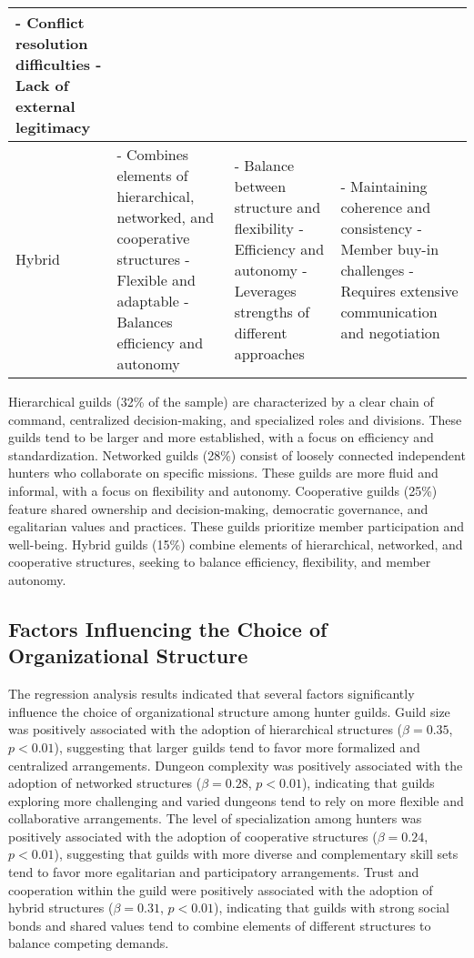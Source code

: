 \documentclass[12pt, a4paper]{article}
\begin{document}
\begin{table}[h]
\begin{tabular}{p{2.5cm}p{3.5cm}p{3.5cm}p{3.5cm}}
- Conflict resolution difficulties\newline
- Lack of external legitimacy
\\
\hline
Hybrid & 
- Combines elements of hierarchical, networked, and cooperative structures\newline
- Flexible and adaptable\newline
- Balances efficiency and autonomy
&
- Balance between structure and flexibility\newline
- Efficiency and autonomy\newline
- Leverages strengths of different approaches
&
- Maintaining coherence and consistency\newline
- Member buy-in challenges\newline
- Requires extensive communication and negotiation
\\
\hline
\end{tabular}
\end{table}

Hierarchical guilds (32\% of the sample) are characterized by a clear chain of command, centralized decision-making, and specialized roles and divisions. These guilds tend to be larger and more established, with a focus on efficiency and standardization. Networked guilds (28\%) consist of loosely connected independent hunters who collaborate on specific missions. These guilds are more fluid and informal, with a focus on flexibility and autonomy. Cooperative guilds (25\%) feature shared ownership and decision-making, democratic governance, and egalitarian values and practices. These guilds prioritize member participation and well-being. Hybrid guilds (15\%) combine elements of hierarchical, networked, and cooperative structures, seeking to balance efficiency, flexibility, and member autonomy.

\subsection{Factors Influencing the Choice of Organizational Structure}
The regression analysis results indicated that several factors significantly influence the choice of organizational structure among hunter guilds. Guild size was positively associated with the adoption of hierarchical structures ($\beta = 0.35$, $p < 0.01$), suggesting that larger guilds tend to favor more formalized and centralized arrangements. Dungeon complexity was positively associated with the adoption of networked structures ($\beta = 0.28$, $p < 0.01$), indicating that guilds exploring more challenging and varied dungeons tend to rely on more flexible and collaborative arrangements. The level of specialization among hunters was positively associated with the adoption of cooperative structures ($\beta = 0.24$, $p < 0.01$), suggesting that guilds with more diverse and complementary skill sets tend to favor more egalitarian and participatory arrangements. Trust and cooperation within the guild were positively associated with the adoption of hybrid structures ($\beta = 0.31$, $p < 0.01$), indicating that guilds with strong social bonds and shared values tend to combine elements of different structures to balance competing demands.
\end{document}
